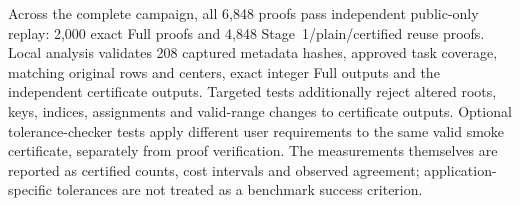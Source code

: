 Across the complete campaign, all 6,848 proofs pass independent public-only replay: 2,000 exact Full proofs and 4,848 Stage~1/plain/certified reuse proofs. Local analysis validates 208 captured metadata hashes, approved task coverage, matching original rows and centers, exact integer Full outputs and the independent certificate outputs. Targeted tests additionally reject altered roots, keys, indices, assignments and valid-range changes to certificate outputs. Optional tolerance-checker tests apply different user requirements to the same valid smoke certificate, separately from proof verification. The measurements themselves are reported as certified counts, cost intervals and observed agreement; application-specific tolerances are not treated as a benchmark success criterion.
